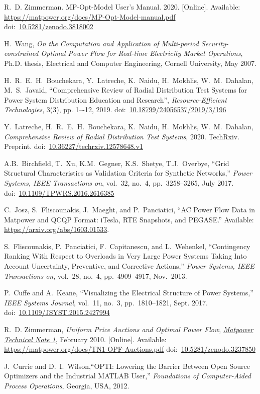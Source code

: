 \documentclass[12pt]{article}
\newcommand{\matpower}[0]{{\sc Matpower}}
\newcommand{\mpom}[0]{{MP-Opt-Model}}
\newcommand{\mpomname}[0]{\mpom{}}
\newcommand{\currentmpommanurl}[0]{https://matpower.org/docs/MP-Opt-Model-manual.pdf}
\newcommand{\TNoneurl}[0]{https://matpower.org/docs/TN1-OPF-Auctions.pdf}
\newcommand{\TNone}[0]{\href{\TNoneurl}{\it \matpower{} Technical Note 1}}
\newcommand{\doi}[1]{doi:~\href{https://doi.org/#1}{#1}}
\numberwithin{equation}{section}
\numberwithin{table}{section}
\numberwithin{figure}{section}
\begin{document}
\begin{thebibliography}{99}
R.~D. Zimmerman. \mpomname{} User's Manual. 2020. [Online]. Available: \url{\currentmpommanurl}
\doi{10.5281/zenodo.3818002}

H.~Wang, \emph{On the Computation and Application of Multi-period Security-constrained Optimal Power Flow for Real-time Electricity Market Operations}, Ph.D. thesis, Electrical and Computer Engineering, Cornell University, May 2007.

H.~R.~E.~H.~Bouchekara, Y.~Latreche, K.~Naidu, H.~Mokhlis, W.~M.~Dahalan, M.~S.~Javaid, ``Comprehensive Review of Radial Distribution Test Systems for Power System Distribution Education and Research'', \emph{Resource-Efficient Technologies}, 3(3), pp. 1–-12, 2019.
\doi{10.18799/24056537/2019/3/196}

Y.~Latreche, H.~R.~E.~H.~Bouchekara, K.~Naidu, H.~Mokhlis, W.~M.~Dahalan, \emph{Comprehensive Review of Radial Distribution Test Systems}, 2020. TechRxiv. Preprint. \doi{10.36227/techrxiv.12578648.v1}

A.B.~Birchfield, T.~Xu, K.M.~Gegner, K.S.~Shetye, T.J.~Overbye,
``Grid Structural Characteristics as Validation Criteria for Synthetic Networks,''  \emph{Power Systems, IEEE Transactions on}, vol.~32, no.~4, pp.~3258--3265, July 2017.
\doi{10.1109/TPWRS.2016.2616385}

C.~Josz, S.~Fliscounakis, J.~Maeght, and P.~Panciatici, ``AC Power
Flow Data in \matpower{} and QCQP Format: iTesla, RTE Snapshots, and PEGASE.''
Available: \url{https://arxiv.org/abs/1603.01533}.

S.~Fliscounakis, P.~Panciatici, F.~Capitanescu, and L.~Wehenkel, ``Contingency Ranking With Respect to Overloads in Very Large Power Systems Taking Into Account Uncertainty, Preventive, and Corrective Actions,'' \emph{Power Systems, IEEE Transactions on}, vol.~28, no.~4, pp.~4909--4917, Nov.~2013.

P.~Cuffe and A.~Keane, ``Visualizing the Electrical Structure of Power Systems,'' \emph{IEEE Systems Journal}, vol.~11, no.~3, pp.~1810--1821, Sept. 2017.
\doi{10.1109/JSYST.2015.2427994}

R.~D. Zimmerman, \emph{Uniform Price Auctions and Optimal Power Flow}, \TNone, February 2010. [Online]. Available: \url{\TNoneurl}
\doi{10.5281/zenodo.3237850}

J.~Currie and D.~I.~Wilson,``OPTI: Lowering the Barrier Between Open Source Optimizers and the Industrial MATLAB User,'' \emph{Foundations of Computer-Aided Process Operations}, Georgia, USA, 2012.


\end{thebibliography}
\end{document}
